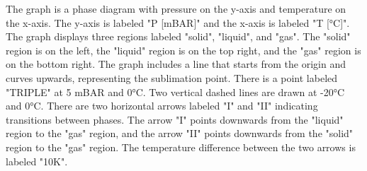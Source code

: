 The graph is a phase diagram with pressure on the y-axis and temperature on the x-axis. The y-axis is labeled "P [mBAR]" and the x-axis is labeled "T [°C]". The graph displays three regions labeled "solid", "liquid", and "gas". The "solid" region is on the left, the "liquid" region is on the top right, and the "gas" region is on the bottom right. The graph includes a line that starts from the origin and curves upwards, representing the sublimation point. There is a point labeled "TRIPLE" at 5 mBAR and 0°C. Two vertical dashed lines are drawn at -20°C and 0°C. There are two horizontal arrows labeled "I" and "II" indicating transitions between phases. The arrow "I" points downwards from the "liquid" region to the "gas" region, and the arrow "II" points downwards from the "solid" region to the "gas" region. The temperature difference between the two arrows is labeled "10K".